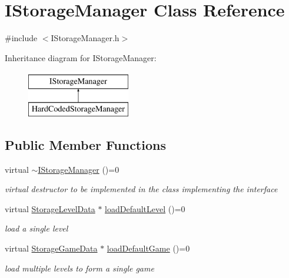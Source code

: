 \hypertarget{class_i_storage_manager}{}\section{I\+Storage\+Manager Class Reference}
\label{class_i_storage_manager}


{\ttfamily \#include $<$I\+Storage\+Manager.\+h$>$}

Inheritance diagram for I\+Storage\+Manager\+:\begin{figure}[H]
\begin{center}
\leavevmode
\includegraphics[height=2.000000cm]{class_i_storage_manager}
\end{center}
\end{figure}
\subsection*{Public Member Functions}
\begin{DoxyCompactItemize}
\item 
\mbox{\label{class_i_storage_manager_a5e3d6fa4a26ce40e4a23a13138a2c055}} 
virtual \mbox{\hyperlink{class_i_storage_manager_a5e3d6fa4a26ce40e4a23a13138a2c055}{$\sim$\+I\+Storage\+Manager}} ()=0
\begin{DoxyCompactList}\small\item\em virtual destructor to be implemented in the class implementing the interface \end{DoxyCompactList}\item 
\mbox{\label{class_i_storage_manager_a084b002900fb2973fd329ab849c0a951}} 
virtual \mbox{\hyperlink{class_storage_level_data}{Storage\+Level\+Data}} $\ast$ \mbox{\hyperlink{class_i_storage_manager_a084b002900fb2973fd329ab849c0a951}{load\+Default\+Level}} ()=0
\begin{DoxyCompactList}\small\item\em load a single level \end{DoxyCompactList}\item 
\mbox{\label{class_i_storage_manager_a8b3f961026b2ddea2accccd1a15dd7d9}} 
virtual \mbox{\hyperlink{class_storage_game_data}{Storage\+Game\+Data}} $\ast$ \mbox{\hyperlink{class_i_storage_manager_a8b3f961026b2ddea2accccd1a15dd7d9}{load\+Default\+Game}} ()=0
\begin{DoxyCompactList}\small\item\em load multiple levels to form a single game \end{DoxyCompactList}\end{DoxyCompactItemize}


